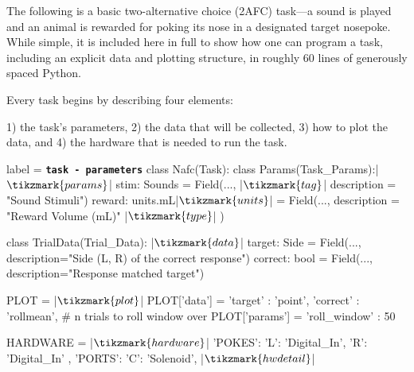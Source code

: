 The following is a basic two-alternative choice (2AFC) task---a sound is played and an animal is rewarded for poking its nose in a designated target nosepoke. While simple, it is included here in full to show how one can program a task, including an explicit data and plotting structure, in roughly 60 lines of generously spaced Python.

\clearpage

Every task begins by describing four elements: 

1) the task's parameters, 2) the data that will be collected, 3) how to plot the data, and 4) the hardware that is needed to run the task.

\begin{pythoncode*}{label = \texttt{\textbf{task - parameters}}}
class Nafc(Task):
    class Params(Task_Params):|$\tikzmark{params}$|
        stim: Sounds = Field(...,          |$\tikzmark{tag}$|
            description = "Sound Stimuli") 
        reward: units.mL|$\tikzmark{units}$| = Field(...,
            description = "Reward Volume (mL)" |$\tikzmark{type}$|
        )

    class TrialData(Trial_Data): |$\tikzmark{data}$|
        target: Side = Field(..., 
            description="Side (L, R) of the correct response")
        correct: bool = Field(...,
            description="Response matched target")

    PLOT = {} |$\tikzmark{plot}$|
    PLOT['data']  =  {'target'  : 'point',
                      'correct' : 'rollmean'},
    # n trials to roll window over
    PLOT['params'] = {'roll_window' : 50}

    HARDWARE = { |$\tikzmark{hardware}$|
        'POKES':{
            'L': 'Digital_In',
            'R': 'Digital_In'
        },
        'PORTS':{
            'C': 'Solenoid', |$\tikzmark{hwdetail}$|
        }
    }
\end{pythoncode*}
%
